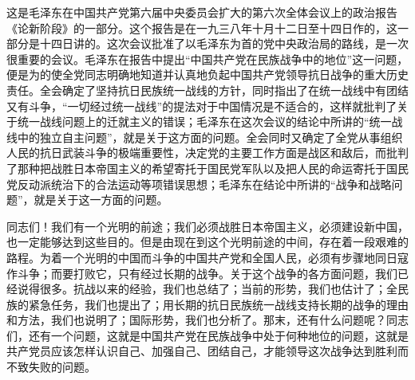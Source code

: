 \documentclass[cn,11pt,chinese]{elegantbook}
\begin{document}
\begin{introduction}
\item 这是毛泽东在中国共产党第六届中央委员会扩大的第六次全体会议上的政治报告《论新阶段》的一部分。这个报告是在一九三八年十月十二日至十四日作的，这一部分是十四日讲的。这次会议批准了以毛泽东为首的党中央政治局的路线，是一次很重要的会议。毛泽东在报告中提出“中国共产党在民族战争中的地位”这一问题，便是为的使全党同志明确地知道并认真地负起中国共产党领导抗日战争的重大历史责任。全会确定了坚持抗日民族统一战线的方针，同时指出了在统一战线中有团结又有斗争，“一切经过统一战线”的提法对于中国情况是不适合的，这样就批判了关于统一战线问题上的迁就主义的错误；毛泽东在这次会议的结论中所讲的“统一战线中的独立自主问题”，就是关于这方面的问题。全会同时又确定了全党从事组织人民的抗日武装斗争的极端重要性，决定党的主要工作方面是战区和敌后，而批判了那种把战胜日本帝国主义的希望寄托于国民党军队以及把人民的命运寄托于国民党反动派统治下的合法运动等项错误思想；毛泽东在结论中所讲的“战争和战略问题”，就是关于这一方面的问题。
\end{introduction}
同志们！我们有一个光明的前途；我们必须战胜日本帝国主义，必须建设新中国，也一定能够达到这些目的。但是由现在到这个光明前途的中间，存在着一段艰难的路程。为着一个光明的中国而斗争的中国共产党和全国人民，必须有步骤地同日寇作斗争；而要打败它，只有经过长期的战争。关于这个战争的各方面问题，我们已经说得很多。抗战以来的经验，我们也总结了；当前的形势，我们也估计了；全民族的紧急任务，我们也提出了；用长期的抗日民族统一战线支持长期的战争的理由和方法，我们也说明了；国际形势，我们也分析了。那末，还有什么问题呢？同志们，还有一个问题，这就是中国共产党在民族战争中处于何种地位的问题，这就是共产党员应该怎样认识自己、加强自己、团结自己，才能领导这次战争达到胜利而不致失败的问题。\\
\end{document}
